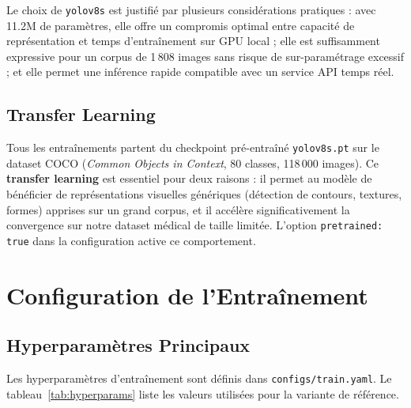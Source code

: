 \documentclass{rapportENSIAS}
\newcommand{\projectpath}[1]{\texttt{#1}}
\begin{document}
Le choix de \texttt{yolov8s} est justifié par plusieurs considérations
pratiques : avec 11.2M de paramètres, elle offre un compromis optimal entre
capacité de représentation et temps d'entraînement sur GPU local ; elle est
suffisamment expressive pour un corpus de 1\,808 images sans risque de
sur-paramétrage excessif ; et elle permet une inférence rapide compatible
avec un service API temps réel.

\subsection{Transfer Learning}

Tous les entraînements partent du checkpoint pré-entraîné \texttt{yolov8s.pt}
sur le dataset COCO (\textit{Common Objects in Context}, 80 classes, 118\,000
images). Ce \textbf{transfer learning} est essentiel pour deux raisons :
il permet au modèle de bénéficier de représentations visuelles génériques
(détection de contours, textures, formes) apprises sur un grand corpus, et
il accélère significativement la convergence sur notre dataset médical de taille
limitée. L'option \texttt{pretrained: true} dans la configuration active ce
comportement.

\section{Configuration de l'Entraînement}

\subsection{Hyperparamètres Principaux}

Les hyperparamètres d'entraînement sont définis dans
\projectpath{configs/train.yaml}. Le tableau~\ref{tab:hyperparams} liste
les valeurs utilisées pour la variante de référence.
\end{document}
